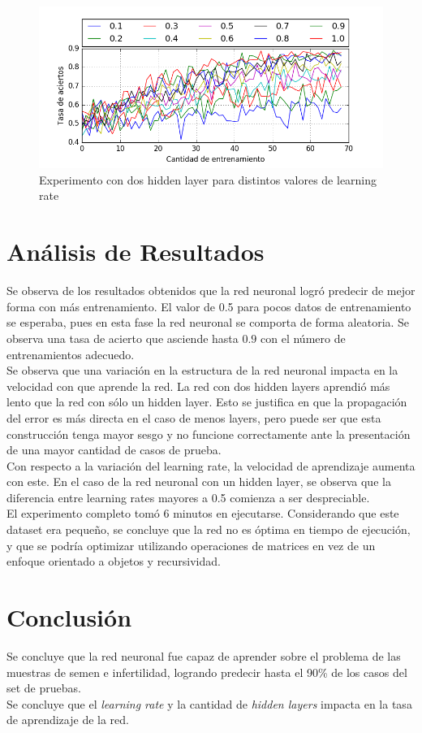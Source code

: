 \documentclass[11pt,letterpaper]{article}
\begin{document}
\begin{figure}[ht!]
\centering \includegraphics[width=\textwidth]{img/exp2.png}
\caption{Experimento con dos hidden layer para distintos valores de learning rate} \label{img2}
\end{figure}
\clearpage
\section{Análisis de Resultados}
Se observa de los resultados obtenidos que la red neuronal logró predecir de
mejor forma con más entrenamiento. El valor de 0.5 para pocos datos de entrenamiento
se esperaba, pues en esta fase la red neuronal se comporta de forma aleatoria.
Se observa una tasa de acierto que asciende hasta $0.9$ con el número de
entrenamientos adecuedo.\\

Se observa que una variación en la estructura de la red neuronal impacta en la
velocidad con que aprende la red. La red con dos hidden layers aprendió más lento
que la red con sólo un hidden layer. Esto se justifica en que la propagación del
error es más directa en el caso de menos layers, pero puede ser que esta construcción
tenga mayor sesgo y no funcione correctamente ante la presentación de una mayor cantidad
de casos de prueba.\\

Con respecto a la variación del learning rate, la velocidad de aprendizaje aumenta con
este. En el caso de la red neuronal con un hidden layer, se observa que la diferencia
entre learning rates mayores a 0.5 comienza a ser despreciable.\\

El experimento completo tomó 6 minutos en ejecutarse. Considerando
que este dataset era pequeño, se concluye que la red no es óptima en tiempo de ejecución, y que se podría
optimizar utilizando operaciones de matrices en vez de un enfoque orientado a objetos y
recursividad.

\section{Conclusión}
Se concluye que la red neuronal fue capaz de aprender sobre el problema de las
muestras de semen e infertilidad, logrando predecir hasta el 90\% de los casos
del set de pruebas.\\

Se concluye que el \textit{learning rate} y la cantidad de \textit{hidden layers}
impacta en la tasa de aprendizaje de la red.



\end{document}
